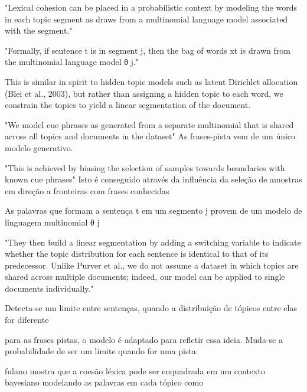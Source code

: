 

"Lexical cohesion can be placed in a probabilistic context by modeling the words in each topic segment as draws from a multinomial language model associated with the segment."

"Formally, if sentence t is in segment j, then the bag of words xt is drawn from the multinomial language model θ j."


This is similar in spirit to hidden topic models such as latent Dirichlet allocation (Blei et al., 2003), but rather than assigning a hidden topic to each word, we constrain the topics to yield a linear segmentation of the document.


"We model cue phrases as generated from a separate multinomial that is shared across all topics and documents in the dataset"
As frases-pista vem de um único modelo generativo.


"This is achieved by biasing the selection of samples towards boundaries with known cue phrases"
{Isto é conseguido através da influência da seleção de amostras em direção a fronteiras com frases conhecidas}


{As palavras que formam a sentença t em um segmento j provem de um modelo de linguagem multinomial θ j}



"They then build a linear segmentation by adding a switching variable to indicate whether the topic distribution for each sentence is identical to that of its predecessor. Unlike Purver et al., we do not assume a dataset in which topics are shared across multiple documents; indeed, our model can be applied to single documents individually."

{Detecta-se um limite entre sentenças, quando a distribuição de tópicos entre elas for diferente}



para as frases pistas, o modelo é adaptado para refletir essa ideia. Muda-se a probabilidade de ser um limite quando for uma pista.

fulano mostra que a coesão léxica pode ser enquadrada em um contexto bayesiano modelando as palavras em cada tópico como 








